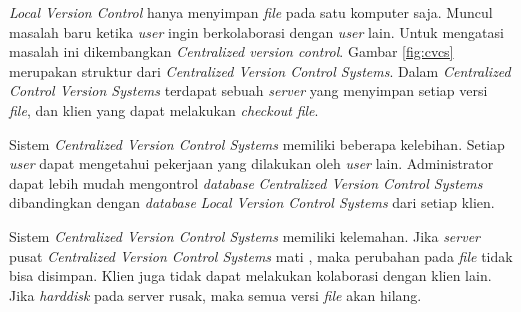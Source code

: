 \textit{Local Version Control} hanya menyimpan \textit{file} pada satu komputer saja. Muncul masalah baru ketika \textit{user} ingin berkolaborasi dengan \textit{user} lain. Untuk mengatasi masalah ini dikembangkan \textit{Centralized version control}. Gambar \ref{fig:cvcs} merupakan struktur dari \textit{Centralized Version Control Systems}. Dalam \textit{Centralized Control Version Systems} terdapat sebuah \textit{server} yang menyimpan setiap versi \textit{file}, dan klien yang dapat melakukan \textit{checkout} \textit{file}.

Sistem \textit{Centralized Version Control Systems} memiliki beberapa kelebihan. Setiap \textit{user}  dapat mengetahui pekerjaan yang dilakukan oleh \textit{user} lain. Administrator dapat lebih mudah mengontrol \textit{database} \textit{Centralized Version Control Systems} dibandingkan dengan \textit{database} \textit{Local Version Control Systems} dari setiap klien.      

Sistem \textit{Centralized Version Control Systems} memiliki kelemahan. Jika \textit{server} pusat \textit{Centralized Version Control Systems} mati , maka perubahan pada \textit{file} tidak bisa disimpan. Klien juga tidak dapat melakukan kolaborasi dengan klien lain. Jika \textit{harddisk} pada server rusak, maka semua versi \textit{file} akan hilang.  


